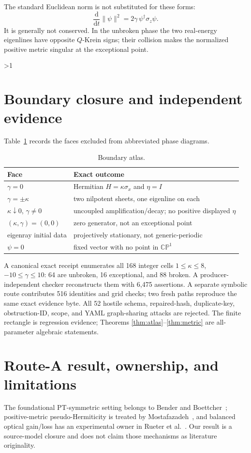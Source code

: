 \documentclass[10pt]{article}
\providecommand{\CRevisionRound}{2}
\newcommand{\CP}{\mathbb {CP}}
\newcommand{\dd}{\mathrm d}
\begin{document}
The standard Euclidean norm is not substituted for these forms:
\[
 \frac{\dd}{\dd t}\|\psi\|^2
 =2\gamma\,\psi^\dagger\sigma_z\psi.
\]
It is generally not conserved.  In the unbroken phase the two real-energy
eigenlines have opposite $Q$-Krein signs; their collision makes the normalized
positive metric singular at the exceptional point.
\fi

\ifnum\CRevisionRound>1
\section{Boundary closure and independent evidence}
Table~\ref{tab:boundary} records the faces excluded from abbreviated phase
diagrams.
\begin{table}[h]
\centering
\small
\begin{tabular}{@{}ll@{}}
\toprule
Face & Exact outcome\\
\midrule
$\gamma=0$ & Hermitian $H=\kappa\sigma_x$ and $\eta=I$\\
$\gamma=\pm\kappa$ & two nilpotent sheets, one eigenline on each\\
$\kappa\downarrow0$, $\gamma\ne0$ & uncoupled amplification/decay; no positive displayed $\eta$\\
$(\kappa,\gamma)=(0,0)$ & zero generator, not an exceptional point\\
eigenray initial data & projectively stationary, not generic-periodic\\
$\psi=0$ & fixed vector with no point in $\CP^1$\\
\bottomrule
\end{tabular}
\caption{Boundary atlas.}\label{tab:boundary}
\end{table}

A canonical exact receipt enumerates all 168 integer cells
$1\le\kappa\le8$, $-10\le\gamma\le10$: 64 are unbroken, 16 exceptional,
and 88 broken.  A producer-independent checker reconstructs them with 6,475
assertions.  A separate symbolic route contributes 516 identities and grid
checks; two fresh paths reproduce the same exact evidence byte.  All 52 hostile
schema, repaired-hash, duplicate-key, obstruction-ID, scope, and YAML
graph-sharing attacks
are rejected.  The finite rectangle is regression evidence; Theorems
\ref{thm:atlas}--\ref{thm:metric} are all-parameter algebraic statements.

\section{Route-A result, ownership, and limitations}
The foundational PT-symmetric setting belongs to Bender and
Boettcher~\cite{BB1998}; positive-metric pseudo-Hermiticity is treated by
Mostafazadeh~\cite{M2002}, and balanced optical gain/loss has an experimental
owner in Rueter et al.~\cite{R2010}.  Our result is a source-model closure and
does not claim those mechanisms as literature originality.
\end{document}
